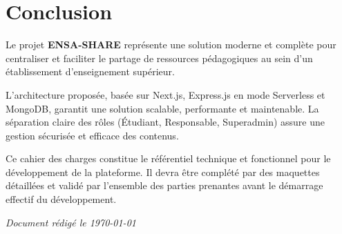 \documentclass[12pt,a4paper]{article}
\begin{document}
\section{Conclusion}

Le projet \textbf{ENSA-SHARE} représente une solution moderne et complète pour centraliser et faciliter le partage de ressources pédagogiques au sein d'un établissement d'enseignement supérieur. 

L'architecture proposée, basée sur Next.js, Express.js en mode Serverless et MongoDB, garantit une solution scalable, performante et maintenable. La séparation claire des rôles (Étudiant, Responsable, Superadmin) assure une gestion sécurisée et efficace des contenus.

Ce cahier des charges constitue le référentiel technique et fonctionnel pour le développement de la plateforme. Il devra être complété par des maquettes détaillées et validé par l'ensemble des parties prenantes avant le démarrage effectif du développement.

\vspace{1cm}

\begin{center}
\textit{Document rédigé le \today}
\end{center}
\end{document}

